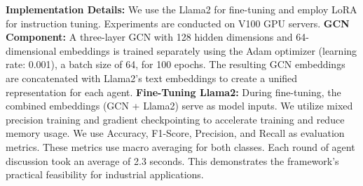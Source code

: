 \noindent\textbf{Implementation Details: }
We use the Llama2 for fine-tuning and employ LoRA \cite{lora} for instruction tuning. Experiments are conducted on V100 GPU servers. 
\textbf{GCN Component:} A three-layer GCN with 128 hidden dimensions and 64-dimensional embeddings is trained separately using the Adam optimizer (learning rate: 0.001), a batch size of 64, for 100 epochs. The resulting GCN embeddings are concatenated with Llama2's text embeddings to create a unified representation for each agent.
\textbf{Fine-Tuning Llama2:} During fine-tuning, the combined embeddings (GCN + Llama2) serve as model inputs. We utilize mixed precision training and gradient checkpointing to accelerate training and reduce memory usage.
We use Accuracy, F1-Score, Precision, and Recall as evaluation metrics. These metrics use macro averaging for both classes.
Each round of agent discussion took an average of 2.3 seconds. This demonstrates the framework's practical feasibility for industrial applications.



